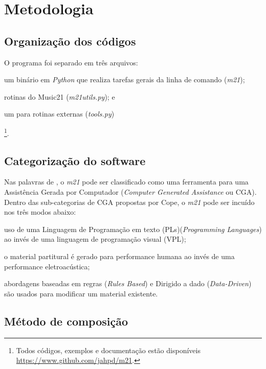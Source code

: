 \section{Metodologia}\label{sec:metodo}

\subsection*{Organização dos códigos}

O programa foi separado em três arquivos: \begin{inparaenum}
\item um binário em \emph{Python} que realiza tarefas gerais da linha de comando (\emph{m21});
\item rotinas do Music21 (\emph{m21utils.py}); e 
\item um para rotinas externas (\emph{tools.py})
\end{inparaenum}\footnote{Todos códigos, exemplos e documentação estão disponíveis \url{https://www.github.com/jahpd/m21}.}.

\subsection*{Categorização do software}

Nas palavras de \cite[p.~x-xiii]{cope_prefacio_2008}, o \emph{m21} pode ser classificado como uma ferramenta para uma Assistência Gerada por Computador (\emph{Computer Generated Assistance} ou CGA). Dentro das sub-categorias de CGA propostas por Cope, o \emph{m21} pode ser incuído nos três modos abaixo:\begin{inparaenum}
\item uso de uma Linguagem de Programação em texto (PLs)(\emph{Programming Languages}) ao invés de uma linguagem de programação visual (VPL); 
\item o material partitural é gerado para performance humana ao invés de uma performance eletroacústica;
\item abordagens baseadas em regras (\emph{Rules Based}) e Dirigido a dado (\emph{Data-Driven}) são usados para modificar um material existente.
\end{inparaenum}

\subsection*{Método de composição}

